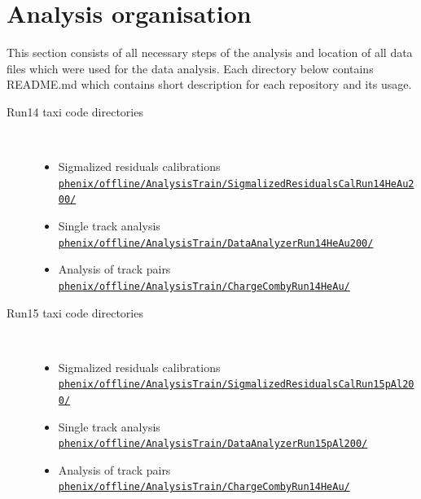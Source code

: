 \section{Analysis organisation}
	This section consists of all necessary steps of the analysis and location of all data files which were used for the data analysis. Each directory below contains README.md which contains short description for each repository and its usage.
	\begin{description}
		\item[Run14 \HeAu taxi code directories]~
			\begin{itemize}
            \item{Sigmalized residuals calibrations} \\
               \href{https://phenix-intra.sdcc.bnl.gov/viewvc/phenix/offline/AnalysisTrain/SigmalizedResidualsCalRun14HeAu200/}{\texttt{phenix/offline/AnalysisTrain/SigmalizedResidualsCalRun14HeAu200/}}
            \item{Single track analysis} \\
               \href{https://phenix-intra.sdcc.bnl.gov/viewvc/phenix/offline/AnalysisTrain/DataAnalyzerRun14HeAu200/}{\texttt{phenix/offline/AnalysisTrain/DataAnalyzerRun14HeAu200/}}
            \item{Analysis of track pairs} \\
               \href{https://phenix-intra.sdcc.bnl.gov/viewvc/phenix/offline/AnalysisTrain/ChargeCombyRun14HeAu200/}{\texttt{phenix/offline/AnalysisTrain/ChargeCombyRun14HeAu/}}
         \end{itemize}
		\item[Run15 \pAl taxi code directories]~
			\begin{itemize}
            \item{Sigmalized residuals calibrations} \\
               \href{https://phenix-intra.sdcc.bnl.gov/viewvc/phenix/offline/AnalysisTrain/SigmalizedResidualsCalRun15pAl200/}{\texttt{phenix/offline/AnalysisTrain/SigmalizedResidualsCalRun15pAl200/}}
            \item{Single track analysis} \\
               \href{https://phenix-intra.sdcc.bnl.gov/viewvc/phenix/offline/AnalysisTrain/DataAnalyzerRun15pAl200/}{\texttt{phenix/offline/AnalysisTrain/DataAnalyzerRun15pAl200/}}
            \item{Analysis of track pairs} \\
               \href{https://phenix-intra.sdcc.bnl.gov/viewvc/phenix/offline/AnalysisTrain/ChargeCombyRun15pAl200/}{\texttt{phenix/offline/AnalysisTrain/ChargeCombyRun14HeAu/}}

\end{itemize}
\end{description}
